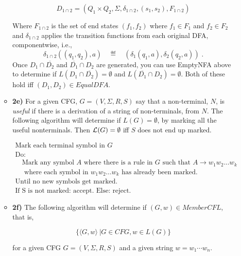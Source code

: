 \documentclass[12pt]{article}
\begin{document}
\begin{enumerate}
\begin{itemize}
\begin{equation*}
D_{1\cap 2} = (Q_1 \times Q_2, \Sigma, \delta_{1\cap 2}, (s_1,s_2), F_{1\cap 2})
\end{equation*}

Where $F_{1\cap 2}$ is the set of end states $(f_1,f_2)$ where $f_1 \in F_1$ and $f_2 \in F_2$ and
$\delta_{1\cap2}$ applies the transition functions from each original DFA, componentwise, i.e.,
\[ \delta_{1\cap2}((q_1,q_2),a) \quad \eqdef \quad (\delta_1(q_1,a), \delta_2(q_2,a))\; .\]
Once $D_1 \cap \overline{D_2}$ and $\overline{D_1} \cap D_2$ are generated, you can use EmptyNFA
above to determine if $L(D_1 \cap \overline{D_2}) = \emptyset$ and $L(\overline{D_1} \cap D_2) =
\emptyset$. Both of these hold iff $(D_1,D_2) \in EqualDFA$.

\item \textbf{2e)} 
For a given CFG,  $G = (V,\Sigma, R, S)$ say that a non-terminal, $N$, is \emph{useful} if there is
a derivation of a string of non-terminals, from $N$.  
The following algorithm will determine if $L(G) = \emptyset$, by marking all the useful
nonterminals.  Then ${\cal L}(G) = \emptyset$ iff $S$ does not end up marked.

\[
\begin{array}{l}
\textrm{Mark each terminal symbol in }G \\
\textrm{Do:} \\
\quad \textrm{Mark any symbol $A$ where there is a rule in $G$ such that }A \rightarrow w_1w_2...w_k \\
\quad \textrm{ where each symbol in $w_1w_2...w_k$ has already been marked.} \\
\textrm{Until no new symbols get marked.} \\
\textrm{If S is not marked: accept. Else: reject.}
\end{array}
\]

\item \textbf{2f)} The following algorithm will determine if $(G,w) \in MemberCFL$, that is,

\begin{equation}
\{\langle G,w\rangle\ | G \in CFG, w \in L(G)\}
\end{equation}

for a given CFG $G = (V, \Sigma, R, S)$ and a given string $w=w_1\cdots w_n$.


\end{itemize}
\end{enumerate}
\end{document}
